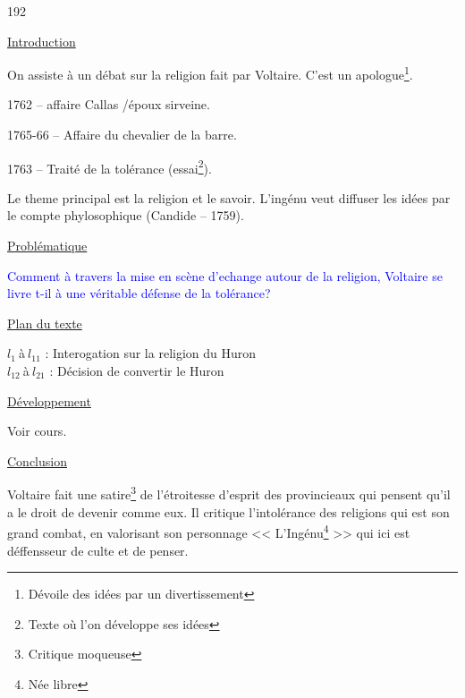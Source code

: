 \documentclass[12pt,a4paper]{article}
\begin{document}
		\begin{dingautolist}{192}

		\item \underline{Introduction} \par
			On assiste à un débat sur la religion fait par Voltaire. C'est un apologue\footnote{Dévoile des idées par un divertissement}.\par
		1762 -- affaire Callas /époux sirveine.\par
		1765-66 -- Affaire du chevalier de la barre.\par
		1763 -- Traité de la tolérance (essai\footnote{Texte où l'on développe ses idées}).\par
		Le theme principal est la religion et le savoir. L'ingénu veut diffuser les idées par le compte phylosophique (Candide -- 1759).

		\item \underline{Probl\'ematique }\par
			\textcolor{blue}{Comment à travers la mise en scène d'echange autour de la religion, Voltaire se livre t-il à une véritable défense de la tolérance? }

		\item \underline{Plan du texte} \par
			$l_{1}~$\`a$~l_{11}$ : Interogation sur la religion du Huron\\ 
			$l_{12}~$\`a$~l_{21}$ : Décision de convertir le Huron
		\item \underline{D\'eveloppement} \par
				Voir cours.

		\item \underline{Conclusion} \par
			Voltaire fait une satire\footnote{Critique moqueuse} de l'étroitesse d'esprit des provincieaux qui pensent qu'il a le droit de devenir comme eux. Il critique l'intolérance des religions qui est son grand combat, en valorisant son personnage << L'Ingénu\footnote{Née libre} >> qui ici est déffensseur de culte et de penser. 




		\end{dingautolist}
		 \newpage
\end{document}
